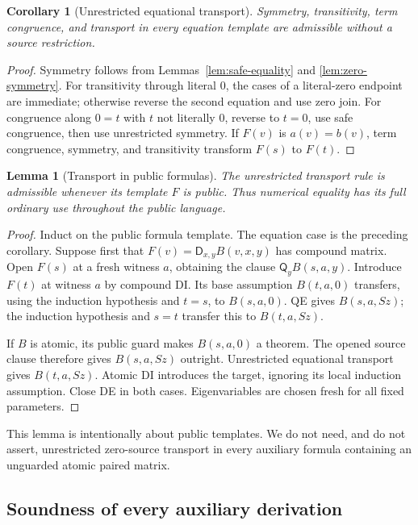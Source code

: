 \documentclass[11pt,letterpaper]{article}
\newtheorem{lemma}[theorem]{Lemma}
\newtheorem{corollary}[theorem]{Corollary}
\theoremstyle{definition}\newtheorem{definition}[theorem]{Definition}
\theoremstyle{remark}\newtheorem{remark}[theorem]{Remark}
\newcommand{\D}{\mathsf D}
\newcommand{\Q}{\mathsf Q}
\begin{document}
\begin{corollary}[Unrestricted equational transport]
Symmetry, transitivity, term congruence, and transport in every equation
template are admissible without a source restriction.
\end{corollary}
\begin{proof}
Symmetry follows from Lemmas~\ref{lem:safe-equality} and
\ref{lem:zero-symmetry}.  For transitivity through literal $0$, the
cases of a literal-zero endpoint are immediate; otherwise reverse the
second equation and use zero join.  For congruence along $0=t$ with
$t$ not literally $0$, reverse to $t=0$, use safe congruence, then
use unrestricted symmetry.  If $F(v)$ is $a(v)=b(v)$, term
congruence, symmetry, and transitivity transform $F(s)$ to $F(t)$.
\end{proof}

\begin{lemma}[Transport in public formulas]\label{lem:public-transport}
The unrestricted transport rule is admissible whenever its template $F$
is public.  Thus numerical equality has its full ordinary use throughout
the public language.
\end{lemma}
\begin{proof}
Induct on the public formula template.  The equation case is the preceding
corollary.  Suppose first that $F(v)=\D_{x,y}B(v,x,y)$ has compound
matrix.  Open $F(s)$ at a fresh witness $a$, obtaining the clause
$\Q_y B(s,a,y)$.  Introduce $F(t)$ at witness $a$ by compound DI.
Its base assumption $B(t,a,0)$ transfers, using the induction hypothesis
and $t=s$, to $B(s,a,0)$.  QE gives $B(s,a,Sz)$; the induction
hypothesis and $s=t$ transfer this to $B(t,a,Sz)$.

If $B$ is atomic, its public guard makes $B(s,a,0)$ a theorem.
The opened source clause therefore gives $B(s,a,Sz)$ outright.
Unrestricted equational transport gives $B(t,a,Sz)$.  Atomic DI
introduces the target, ignoring its local induction assumption.
Close DE in both cases.  Eigenvariables are chosen fresh for all fixed
parameters.
\end{proof}

This lemma is intentionally about public templates.  We do not need, and
do not assert, unrestricted zero-source transport in every auxiliary
formula containing an unguarded atomic paired matrix.

\subsection{Soundness of every auxiliary derivation}
\end{document}
